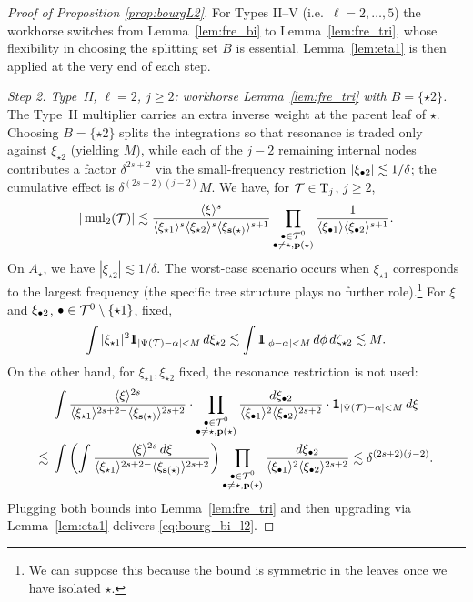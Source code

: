 \begin{proof}[Proof of Proposition \ref{prop:bourgL2}]
\medskip

For Types II--V (i.e.\ $\ell=2,\dots,5$) the workhorse switches from Lemma~\ref{lem:fre_bi} to Lemma~\ref{lem:fre_tri}, whose flexibility in choosing the splitting set $B$ is essential. Lemma~\ref{lem:eta1} is then applied at the very end of each step.

\medskip

\noi\textit{Step 2. Type~II, $\ell=2$, $j\ge 2$: workhorse Lemma~\ref{lem:fre_tri} with $B=\{\star 2\}$.}
The Type~II multiplier carries an extra inverse weight at the parent leaf of $\star$. Choosing $B=\{\star 2\}$ splits the integrations so that resonance is traded only against $\xi_{\star 2}$ (yielding $M$), while each of the $j-2$ remaining internal nodes contributes a factor $\delta^{2s+2}$ via the small-frequency restriction $|\xi_{\bullet 2}|\lesssim 1/\delta$; the cumulative effect is $\delta^{(2s+2)(j-2)}M$.
We have, for $\mathcal{T}\in \mathrm{T}_j$, $j\ge 2$,
$$
|\operatorname{mul}_2(\mathcal{T})| \lesssim \frac{\langle \xi \rangle^s}{\langle \xi_{\star1} \rangle^{s}\langle \xi_{\star2} \rangle^{s}\langle \xi_{\mathbf{s}(\star)} \rangle^{s+1}}\prod_{\substack{\bullet\in\mathcal{T}^0\\\bullet\neq \star, \mathbf{p}(\star)}} \frac{1}{\langle \xi_{\bullet1} \rangle\langle \xi_{\bullet2} \rangle^{s+1}}.
$$
On $A_\star$, we have $|\xi_{\star2}|\lesssim 1/\delta$. The worst-case scenario occurs when $\xi_{\star1}$ corresponds to the largest frequency (the specific tree structure plays no further role).\footnote{We can suppose this because the bound is symmetric in the leaves once we have isolated $\star$.} For $\xi$ and $\xi_{\bullet2}$, $\bullet\in \mathcal{T}^0\setminus\{\star1\}$, fixed,
\begin{equation}
\int |\xi_{\star1}|^2\ind_{|\Psi(\TT)-\alpha|<M} \,d\xi_{\star2} \lesssim \int \ind_{|\phi-\alpha|<M} \,d\phi\, d\zeta_{\star2} \lesssim M.
\end{equation}
On the other hand, for $\xi_{\star1},\xi_{\star2}$ fixed, the resonance restriction is not used:
\begin{align*}
&\int \frac{\jap{\xi}^{2s}}{\jap{\xi_{\star1}}^{2s+2-}\jap{\xi_{\sbf(\star)}}^{2s+2}}\cdot\prod_{\substack{\bul\in\TT^0\\\bul\neq \star, \pb(\star)}} \frac{d\xi_{\bul2}}{\jap{\xi_{\bul1}}^2\jap{\xi_{\bul2}}^{2s+2}}\cdot \ind_{|\Psi(\TT)-\alpha|<M}\, d\xi\\
\lesssim {}& \int\left(\int \frac{\jap{\xi}^{2s}\,d\xi}{\jap{\xi_{\star1}}^{2s+2-}\jap{\xi_{\sbf(\star)}}^{2s+2}}\right)\prod_{\substack{\bul\in\TT^0\\\bul\neq \star, \pb(\star)}} \frac{d\xi_{\bul2}}{\jap{\xi_{\bul1}}^2\jap{\xi_{\bul2}}^{2s+2}}  \lesssim \delta^{(2s+2)(j-2)}.
\end{align*}
Plugging both bounds into Lemma~\ref{lem:fre_tri} and then upgrading via Lemma~\ref{lem:eta1} delivers \eqref{eq:bourg_bi_l2}.


\end{proof}
